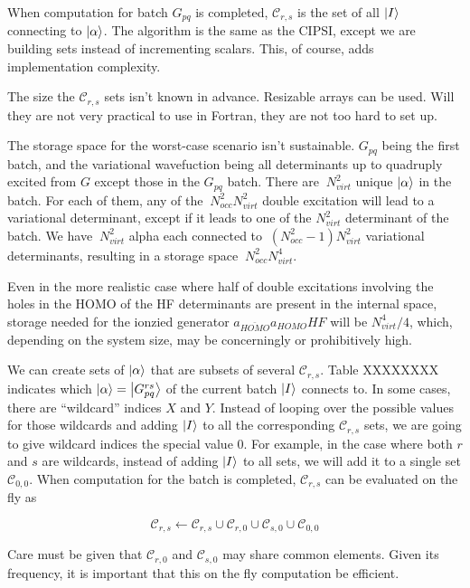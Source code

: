 \documentclass[./thesis.tex]{subfiles}
\begin{document}
When computation for batch $G_{pq}$ is completed, $\mathcal{C}_{r,s}$ is the set of all ${\ket{I}}$ connecting to ${\ket{\alpha}}$. The algorithm is the same as the CIPSI, except we are building sets instead of incrementing scalars. This, of course, adds implementation complexity.

The size the $\mathcal{C}_{r,s}$ sets isn't known in advance. Resizable arrays can be used. Will they are not very practical to use in Fortran, they are not too hard to set up. 


The storage space for the worst-case scenario isn't sustainable.
$G_{pq}$ being the first batch, and the variational wavefuction being all determinants up to quadruply excited from $G$ except those in the $G_{pq}$ batch. There are $~ N_{virt}^2$ unique ${\ket{\alpha}}$ in the batch. For each of them, any of the $~N_{occ}^2 N_{virt}^2$ double excitation will lead to a variational determinant, except if it leads to one of the $N_{virt}^2$ determinant of the batch.
We have $~ N_{virt}^2$ alpha each connected to $~(N_{occ}^2-1) N_{virt}^2$ variational determinants, resulting in a storage space $~N_{occ}^2 N_{virt}^4$.

Even in the more realistic case where half of double excitations involving the holes in the HOMO of the HF determinants are present in the internal space, storage needed for the ionzied generator $a_{\bar{HOMO}} a_{HOMO} HF$ will be $N_{virt}^4 / 4$, which, depending on the system size, may be concerningly or prohibitively high. 

We can create sets of ${\ket{\alpha}}$ that are subsets of several $\mathcal{C}_{r,s}$. Table XXXXXXXX indicates which ${\ket{\alpha}} = \ket {G_{pq}^{rs}}$ of the current batch ${\ket{I}}$ connects to. In some cases, there are ``wildcard'' indices $X$ and $Y$. Instead of looping over the possible values for those wildcards and adding ${\ket{I}}$ to all the corresponding $\mathcal{C}_{r,s}$ sets, we are going to give wildcard indices the special value $0$. For example, in the case where both $r$ and $s$ are wildcards, instead of adding ${\ket{I}}$ to all sets, we will add it to a single set $\mathcal{C}_{0,0}$. When computation for the batch is completed, $\mathcal{C}_{r,s}$ can be evaluated on the fly as

\begin{equation}
\mathcal{C}_{r,s} \gets \mathcal{C}_{r,s} \cup \mathcal{C}_{r,0} \cup \mathcal{C}_{s,0} \cup \mathcal{C}_{0,0}
\end{equation}

Care must be given that $\mathcal{C}_{r,0}$ and $\mathcal{C}_{s,0}$ may share common elements. Given its frequency, it is important that this on the fly computation be efficient.
\end{document}

